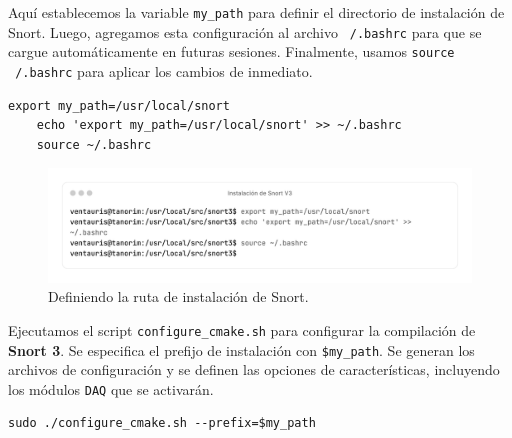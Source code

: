 \documentclass[11pt,a4paper,twoside]{report}
\begin{document}
Aquí establecemos la variable \texttt{my\_path} para definir el directorio de instalación de Snort. Luego, agregamos esta configuración al archivo \texttt{~/.bashrc} para que se cargue automáticamente en futuras sesiones. Finalmente, usamos \texttt{source ~/.bashrc} para aplicar los cambios de inmediato.

\begin{lstlisting}[style=commandstyle, caption={Estableciendo la ruta de instalación en la variable my\_path}]
	export my_path=/usr/local/snort
	echo 'export my_path=/usr/local/snort' >> ~/.bashrc
	source ~/.bashrc
\end{lstlisting}

\begin{figure}[H]
	\centering
	\includegraphics[scale=0.12]{instalacion_snort/18-18.png}
	\caption{Definiendo la ruta de instalación de Snort.}
\end{figure}

\newpage

Ejecutamos el script \texttt{configure\_cmake.sh} para configurar la compilación de \textbf{Snort 3}. Se especifica el prefijo de instalación con \texttt{\$my\_path}. Se generan los archivos de configuración y se definen las opciones de características, incluyendo los módulos \texttt{DAQ} que se activarán.

\begin{lstlisting}[style=commandstyle, caption={Configurando Snort 3 con CMake}]
	sudo ./configure_cmake.sh --prefix=$my_path
\end{lstlisting}
\end{document}
